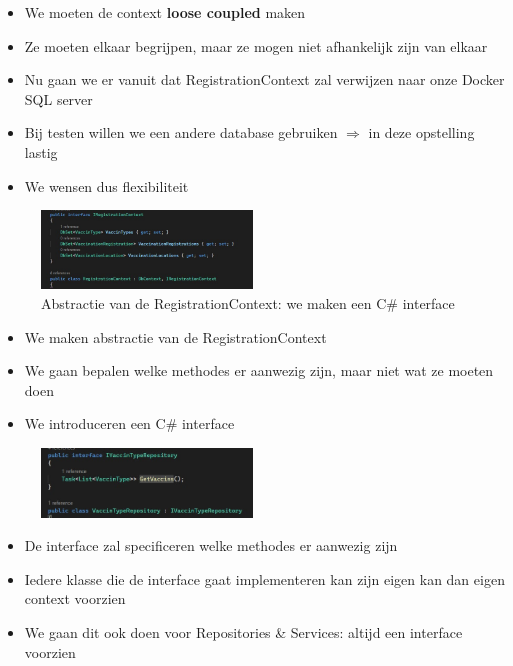 \documentclass{article}
\begin{document}
\begin{itemize}
    \item We moeten de context \textbf{loose coupled} maken
    \item Ze moeten elkaar begrijpen, maar ze mogen niet afhankelijk zijn van elkaar
    \item Nu gaan we er vanuit dat RegistrationContext zal verwijzen naar onze Docker SQL server
    \item Bij testen willen we een andere database gebruiken $\Rightarrow$ in deze opstelling lastig
    \item We wensen dus flexibiliteit
\end{itemize}

\begin{figure}[H]
    \centering
    \includegraphics[width=0.5\textwidth]{repositories-3.png}
    \caption{Abstractie van de RegistrationContext: we maken een C\# interface}
\end{figure}

\begin{itemize}
    \item We maken abstractie van de RegistrationContext
    \item We gaan bepalen welke methodes er aanwezig zijn, maar niet wat ze moeten doen
    \item We introduceren een C\# interface
\end{itemize}

\begin{figure}[H]
    \centering
    \includegraphics[width=0.5\textwidth]{repositories-4.png}
    \caption{}
\end{figure}

\begin{itemize}
    \item De interface zal specificeren welke methodes er aanwezig zijn
    \item Iedere klasse die de interface gaat implementeren kan zijn eigen kan dan eigen context voorzien
    \item We gaan dit ook doen voor Repositories \& Services: altijd een interface voorzien
\end{itemize}
\end{document}
